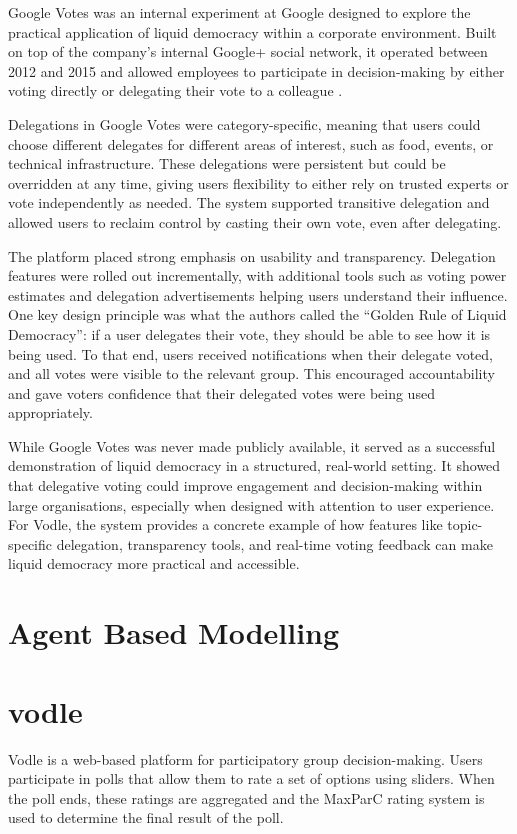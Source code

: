 Google Votes was an internal experiment at Google designed to explore the practical application of liquid democracy within a corporate environment. Built on top of the company's internal Google+ social network, it operated between 2012 and 2015 and allowed employees to participate in decision-making by either voting directly or delegating their vote to a colleague \citep{hardt_google_2015}.

Delegations in Google Votes were category-specific, meaning that users could choose different delegates for different areas of interest, such as food, events, or technical infrastructure. These delegations were persistent but could be overridden at any time, giving users flexibility to either rely on trusted experts or vote independently as needed. The system supported transitive delegation and allowed users to reclaim control by casting their own vote, even after delegating.

The platform placed strong emphasis on usability and transparency. Delegation features were rolled out incrementally, with additional tools such as voting power estimates and delegation advertisements helping users understand their influence. One key design principle was what the authors called the ``Golden Rule of Liquid Democracy'': if a user delegates their vote, they should be able to see how it is being used. To that end, users received notifications when their delegate voted, and all votes were visible to the relevant group. This encouraged accountability and gave voters confidence that their delegated votes were being used appropriately.

While Google Votes was never made publicly available, it served as a successful demonstration of liquid democracy in a structured, real-world setting. It showed that delegative voting could improve engagement and decision-making within large organisations, especially when designed with attention to user experience. For Vodle, the system provides a concrete example of how features like topic-specific delegation, transparency tools, and real-time voting feedback can make liquid democracy more practical and accessible.
\section{Agent Based Modelling}
\section{vodle}
Vodle is a web-based platform for participatory group decision-making. Users participate in polls that allow them to rate a set of options using sliders. When the poll ends, these ratings are aggregated and the MaxParC rating system is used to determine the final result of the poll.

